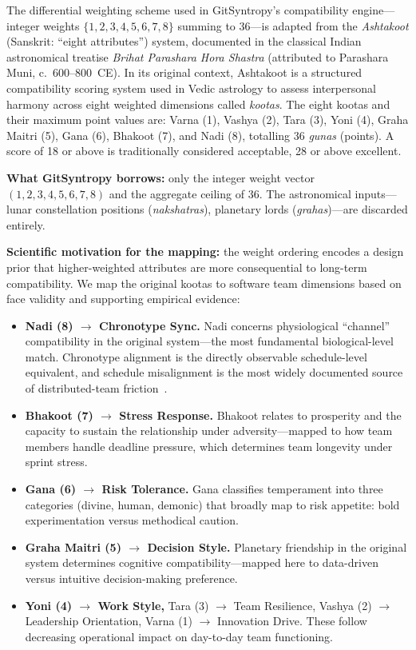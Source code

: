 \documentclass[conference]{IEEEtran}
\begin{document}
The differential weighting scheme used in GitSyntropy's compatibility
engine---integer weights $\{1,2,3,4,5,6,7,8\}$ summing to 36---is
adapted from the \textit{Ashtakoot} (Sanskrit: ``eight attributes'')
system, documented in the classical Indian astronomical treatise
\textit{Brihat Parashara Hora Shastra} (attributed to Parashara Muni,
c.\ 600--800~CE).  In its original context, Ashtakoot is a
structured compatibility scoring system used in Vedic astrology to
assess interpersonal harmony across eight weighted dimensions called
\textit{kootas}.  The eight kootas and their maximum point values
are: Varna (1), Vashya (2), Tara (3), Yoni (4), Graha Maitri (5),
Gana (6), Bhakoot (7), and Nadi (8), totalling 36 \textit{gunas}
(points).  A score of 18 or above is traditionally considered
acceptable, 28 or above excellent.

\textbf{What GitSyntropy borrows:} only the integer weight vector
$(1,2,3,4,5,6,7,8)$ and the aggregate ceiling of 36.  The
astronomical inputs---lunar constellation positions (\textit{nakshatras}),
planetary lords (\textit{grahas})---are discarded entirely.

\textbf{Scientific motivation for the mapping:} the weight ordering
encodes a design prior that higher-weighted attributes are more
consequential to long-term compatibility.  We map the original
kootas to software team dimensions based on face validity and
supporting empirical evidence:

\begin{itemize}
  \item \textbf{Nadi (8) $\to$ Chronotype Sync.}  Nadi concerns
    physiological ``channel'' compatibility in the original
    system---the most fundamental biological-level match.
    Chronotype alignment is the directly observable schedule-level
    equivalent, and schedule misalignment is the most widely
    documented source of distributed-team friction~\cite{holmstrom2006}.
  \item \textbf{Bhakoot (7) $\to$ Stress Response.}  Bhakoot
    relates to prosperity and the capacity to sustain the relationship
    under adversity---mapped to how team members handle deadline
    pressure, which determines team longevity under sprint stress.
  \item \textbf{Gana (6) $\to$ Risk Tolerance.}  Gana classifies
    temperament into three categories (divine, human, demonic) that
    broadly map to risk appetite: bold experimentation versus
    methodical caution.
  \item \textbf{Graha Maitri (5) $\to$ Decision Style.}  Planetary
    friendship in the original system determines cognitive
    compatibility---mapped here to data-driven versus intuitive
    decision-making preference.
  \item \textbf{Yoni (4) $\to$ Work Style,} Tara (3) $\to$ Team
    Resilience, Vashya (2) $\to$ Leadership Orientation,
    Varna (1) $\to$ Innovation Drive.  These follow decreasing
    operational impact on day-to-day team functioning.
\end{itemize}
\end{document}
